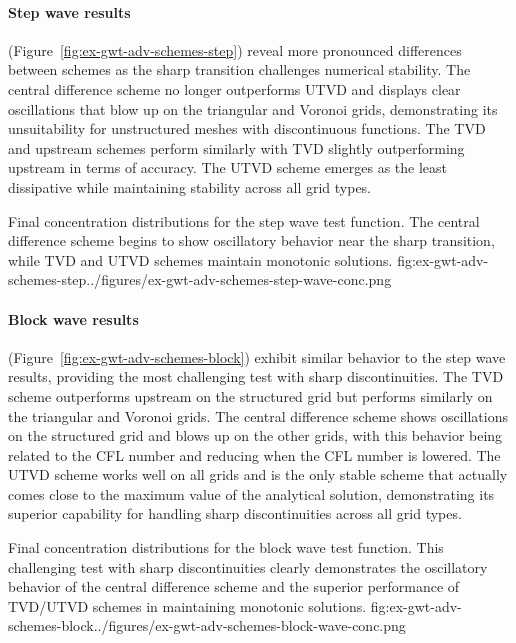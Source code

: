 \paragraph{Step wave results} (Figure~\ref{fig:ex-gwt-adv-schemes-step}) reveal more pronounced differences between schemes as the sharp transition challenges numerical stability. The central difference scheme no longer outperforms UTVD and displays clear oscillations that blow up on the triangular and Voronoi grids, demonstrating its unsuitability for unstructured meshes with discontinuous functions. The TVD and upstream schemes perform similarly with TVD slightly outperforming upstream in terms of accuracy. The UTVD scheme emerges as the least dissipative while maintaining stability across all grid types.
\begin{StandardFigure}{
    Final concentration distributions for the step wave test function. The central difference scheme begins to show oscillatory behavior near the sharp transition, while TVD and UTVD schemes maintain monotonic solutions.
}{fig:ex-gwt-adv-schemes-step}{../figures/ex-gwt-adv-schemes-step-wave-conc.png}
\end{StandardFigure}

\paragraph{Block wave results} (Figure~\ref{fig:ex-gwt-adv-schemes-block}) exhibit similar behavior to the step wave results, providing the most challenging test with sharp discontinuities. The TVD scheme outperforms upstream on the structured grid but performs similarly on the triangular and Voronoi grids. The central difference scheme shows oscillations on the structured grid and blows up on the other grids, with this behavior being related to the CFL number and reducing when the CFL number is lowered. The UTVD scheme works well on all grids and is the only stable scheme that actually comes close to the maximum value of the analytical solution, demonstrating its superior capability for handling sharp discontinuities across all grid types.
\begin{StandardFigure}{
    Final concentration distributions for the block wave test function. This challenging test with sharp discontinuities clearly demonstrates the oscillatory behavior of the central difference scheme and the superior performance of TVD/UTVD schemes in maintaining monotonic solutions.
}{fig:ex-gwt-adv-schemes-block}{../figures/ex-gwt-adv-schemes-block-wave-conc.png}
\end{StandardFigure}

